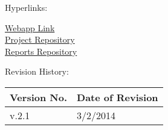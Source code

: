 {

Hyperlinks:\\
\begin{center}
\href{http://192.241.248.91}{Webapp Link}\\
\href{https://github.com/dkarivalis/SEP_SMIFL}{Project Repository}\\
\href{https://github.com/dkarivalis/SEP_SMIFL_reports}{Reports Repository}\\
\end{center}

Revision History:
\begin{longtable}{|p{1.6in}|p{2.6in}|}
\hline
{\large\color{color1}Version No.}&{\large \color{color1}Date of Revision}\\\hline
v.2.1&3/2/2014  \\ \hline
\end{longtable}

\vspace{20mm}\

}

